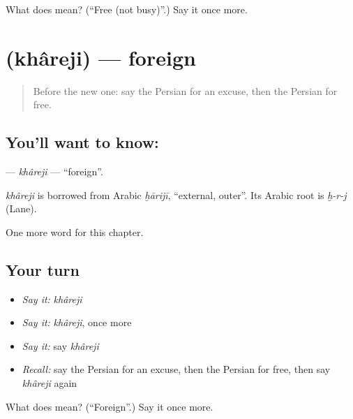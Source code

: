 \begin{tcolorbox}[breakable,colback=teal!4,colframe=teal!35!black,title={Before you move on}]
What does  mean? (\textquotedblleft{}Free (not busy)\textquotedblright{}.) Say it once more.
\end{tcolorbox}
\section[\texorpdfstring{\fa{خارجی} (khâreji)}{خارجی (khâreji)}]{ (khâreji) — foreign}

\label{lesson:FA-C271-khareji}



\begin{quote}
Before the new one: say the Persian for an excuse, then the Persian for free.
\end{quote}

\subsection*{You'll want to know: }
\textbf{} — \emph{khâreji} — \textquotedblleft{}foreign\textquotedblright{}.

\begin{cousinweb}
\emph{khâreji} is borrowed from Arabic \emph{ḫārijī}, \textquotedblleft{}external, outer\textquotedblright{}. Its Arabic root is \emph{ḫ-r-j} (Lane).
\end{cousinweb}

\begin{grammarlens}[title={What you've built}]
One more word for this chapter.
\end{grammarlens}

\subsection*{Your turn}
\begin{itemize}
\raggedright
  \item \emph{Say it:} \emph{khâreji}
  \item \emph{Say it:} \emph{khâreji}, once more
  \item \emph{Say it:} say \emph{khâreji}
  \item \emph{Recall:} say the Persian for an excuse, then the Persian for free, then say \emph{khâreji} again
\end{itemize}

\begin{tcolorbox}[breakable,colback=teal!4,colframe=teal!35!black,title={Before you move on}]
What does  mean? (\textquotedblleft{}Foreign\textquotedblright{}.) Say it once more.
\end{tcolorbox}
